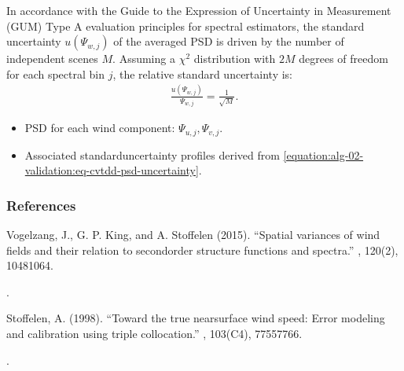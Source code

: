 \documentclass[a4paper,10pt,english]{sphinxmanual}
\begin{document}
\sphinxAtStartPar
{}

\sphinxAtStartPar
In accordance with the Guide to the Expression of Uncertainty in Measurement
(GUM) Type A evaluation principles for spectral estimators, the standard
uncertainty \(u(\Psi_{w,j})\) of the averaged PSD is driven by the number
of independent scenes \(M\). Assuming a \(\chi^2\) distribution with
\(2M\) degrees of freedom for each spectral bin \(j\), the relative
standard uncertainty is:
\begin{equation}\label{equation:alg-02-validation:eq-cvtdd-psd-uncertainty}
\begin{split}\frac{u(\Psi_{w,j})}{\Psi_{w,j}}=\frac{1}{\sqrt{M}} .\end{split}
\end{equation}
\sphinxAtStartPar
{}
\begin{itemize}
\item {} 
\sphinxAtStartPar
PSD for each wind component: \(\Psi_{u,j},\Psi_{v,j}\).

\item {} 
\sphinxAtStartPar
Associated standard\sphinxhyphen{}uncertainty profiles derived from
\eqref{equation:alg-02-validation:eq-cvtdd-psd-uncertainty}.

\end{itemize}
\subsubsection*{References}
\label{\detokenize{alg-02-validation:ref-vogelzang-spatial-variance}}
\sphinxAtStartPar
Vogelzang, J., G. P. King, and A. Stoffelen (2015). “Spatial variances of wind
fields and their relation to second\sphinxhyphen{}order structure functions and spectra.”
, 120(2), 1048\textendash{}1064.
%
\begin{footnote}[6]\sphinxAtStartFootnote
{}
%
\end{footnote}.

\label{\detokenize{alg-02-validation:ref-stoffelen-triple-collocation}}
\sphinxAtStartPar
Stoffelen, A. (1998). “Toward the true near\sphinxhyphen{}surface wind speed: Error modeling
and calibration using triple collocation.” , 103(C4), 7755\textendash{}7766.
%
\begin{footnote}[7]\sphinxAtStartFootnote
{}
%
\end{footnote}.
\end{document}
